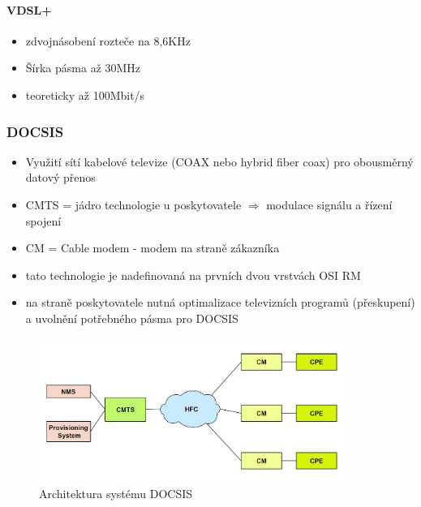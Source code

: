 \documentclass[10pt,a4paper]{article}
\begin{document}
\paragraph{VDSL+}
\begin{itemize}
\item zdvojnásobení rozteče na 8,6KHz
\item Šírka pásma až 30MHz
\item teoreticky až 100Mbit/s
\end{itemize}

\subsubsection{DOCSIS}
\begin{itemize}
\item Využití sítí kabelové televize (COAX nebo hybrid fiber coax) pro obousměrný datový přenos
\item CMTS = jádro technologie u poskytovatele $\Rightarrow$ modulace signálu a řízení spojení
\item CM = Cable modem - modem na straně zákazníka
\item tato technologie je nadefinovaná na prvních dvou vrstvách OSI RM
\item na straně poskytovatele nutná optimalizace televizních programů (přeskupení) a uvolnění potřebného pásma pro DOCSIS
\end{itemize}


\begin{figure}[ht]
    \centering
    \includegraphics[width=10cm]{architekturaDocsis.png}
    \caption{Architektura systému DOCSIS}
    \label{fig:architekturaDocsis}
\end{figure}
\end{document}
